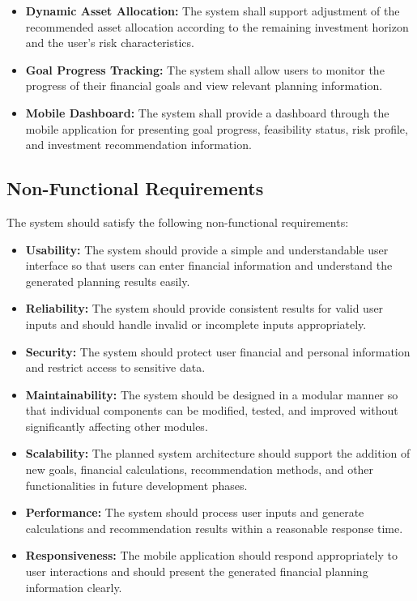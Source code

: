 \begin{itemize}
    \item \textbf{Dynamic Asset Allocation:}
    The system shall support adjustment of the recommended asset
    allocation according to the remaining investment horizon and the
    user's risk characteristics.

    \item \textbf{Goal Progress Tracking:}
    The system shall allow users to monitor the progress of their
    financial goals and view relevant planning information.

    \item \textbf{Mobile Dashboard:}
    The system shall provide a dashboard through the mobile
    application for presenting goal progress, feasibility status,
    risk profile, and investment recommendation information.

\end{itemize}

\subsection{Non-Functional Requirements}

The system should satisfy the following non-functional requirements:

\begin{itemize}

    \item \textbf{Usability:}
    The system should provide a simple and understandable user
    interface so that users can enter financial information and
    understand the generated planning results easily.

    \item \textbf{Reliability:}
    The system should provide consistent results for valid user
    inputs and should handle invalid or incomplete inputs
    appropriately.

    \item \textbf{Security:}
    The system should protect user financial and personal information
    and restrict access to sensitive data.

    \item \textbf{Maintainability:}
    The system should be designed in a modular manner so that
    individual components can be modified, tested, and improved
    without significantly affecting other modules.

    \item \textbf{Scalability:}
    The planned system architecture should support the addition of
    new goals, financial calculations, recommendation methods, and
    other functionalities in future development phases.

    \item \textbf{Performance:}
    The system should process user inputs and generate calculations
    and recommendation results within a reasonable response time.

    \item \textbf{Responsiveness:}
    The mobile application should respond appropriately to user
    interactions and should present the generated financial planning
    information clearly.

\end{itemize}

